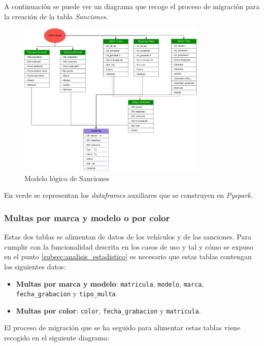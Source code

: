 \documentclass[]{article}
\begin{document}
A continuación se puede ver un diagrama que recoge el proceso de migración para la creación de la tabla \textit{Sanciones}.
\begin{figure}[H]
    \centering
    \includegraphics[width=0.8\textwidth]{./imagenes/Sanciones.png}
    \caption{Modelo lógico de Sanciones}
    \label{fig:modelo_sanciones}
\end{figure}

En verde se representan los \textit{dataframes} auxiliares que se construyen en \textit{Pyspark}.

\subsubsection{Multas por marca y modelo o por color}

Estas dos tablas se alimentan de datos de los vehículos y de las sanciones.
Para cumplir con la funcionalidad descrita en los casos de uso y tal y cómo se
expuso en el punto \ref{subsec:analisis_estadistico} es necesario que estas
tablas contengan los siguientes datos: 

\begin{itemize}
    \item\textbf{Multas por marca y modelo}: \verb!matricula!, \verb!modelo!,
    \verb!marca!, \verb!fecha_grabacion! y \verb!tipo_multa!.
    \item\textbf{Multas por color}: \verb!color!, \verb!fecha_grabacion! y \verb!matricula!.
\end{itemize}

El proceso de migración que se ha seguido para alimentar estas tablas viene recogido en el siguiente diagrama:
\end{document}

